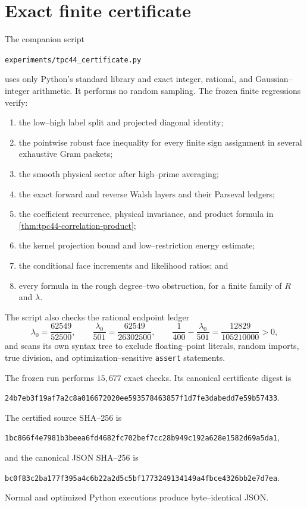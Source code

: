 \section{Exact finite certificate}
\label{sec:tpc44-certificate}

The companion script
\begin{center}
\texttt{experiments/tpc44\_certificate.py}
\end{center}
uses only Python's standard library and exact integer, rational, and
Gaussian--integer arithmetic.  It performs no random sampling.  The
frozen finite regressions verify:
\begin{enumerate}[label=(\roman*)]
 \item the low--high label split and projected diagonal identity;
 \item the pointwise robust face inequality for every finite sign
 assignment in several exhaustive Gram packets;
 \item the smooth physical sector after high--prime averaging;
 \item the exact forward and reverse Walsh layers and their Parseval
 ledgers;
 \item the coefficient recurrence, physical invariance, and product
 formula in \cref{thm:tpc44-correlation-product};
 \item the kernel projection bound and low--restriction energy estimate;
 \item the conditional face increments and likelihood ratios; and
 \item every formula in the rough degree--two obstruction, for a finite
 family of \(R\) and \(\lambda\).
\end{enumerate}
The script also checks the rational endpoint ledger
\begin{equation}
 \lambda_0=\frac{62549}{52500},
 \qquad
 \frac{\lambda_0}{501}=\frac{62549}{26302500},
 \qquad
 \frac1{400}-\frac{\lambda_0}{501}
 =\frac{12829}{105210000}>0,
 \label{eq:tpc44-certificate-ledger}
\end{equation}
and scans its own syntax tree to exclude floating--point literals,
random imports, true division, and optimization--sensitive
\texttt{assert} statements.

The frozen run performs \(15{,}677\) exact checks.  Its canonical
certificate digest is
\begin{center}
\texttt{24b7eb3f19af7a2c8a016672020ee593578463857f1d7fe3dabedd7e59b57433}.
\end{center}
The certified source SHA--256 is
\begin{center}
\texttt{1bc866f4e7981b3beea6fd4682fc702bef7cc28b949c192a628e1582d69a5da1},
\end{center}
and the canonical JSON SHA--256 is
\begin{center}
\texttt{bc0f83c2ba177f395a4c6b22a2d5c5bf1773249134149a4fbce4326bb2e7d7ea}.
\end{center}
Normal and optimized Python executions produce byte--identical JSON.

